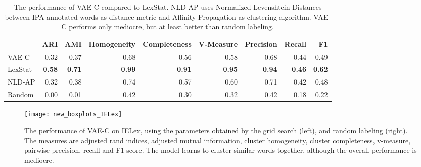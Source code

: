 \documentclass[6pt]{article}
\begin{document}
\begin{table}
\begin{tabular}{l | rrrrrrrr}
\toprule
{} &       ARI &       AMI &         Homogeneity &        Completeness &         V-Measure &Precision&Recall&F1 \\  \hline
\midrule
VAE-C &  0.32 &  0.37 &  0.68 &  0.56 &  0.58 &  0.68 &  0.44 &  0.49 \\ 
LexStat & \textbf{0.58} & \textbf{0.71} & \textbf{0.99} & \textbf{0.91} &  \textbf{0.95} & \textbf{0.94} & \textbf{0.46} &  \textbf{0.62} \\
NLD-AP &  0.32 & 0.38 & 0.74 &0.57 & 0.60 & 0.71 & 0.42 & 0.48 \\
Random &  0.00 &  0.01 &  0.42 &  0.30 &  0.32 &  0.42 &  0.18 &  0.22 \\
\bottomrule
\end{tabular}
\caption{The performance of VAE-C compared to LexStat. NLD-AP uses Normalized Levenshtein Distances between IPA-annotated words as distance metric and Affinity Propagation as clustering algorithm. VAE-C performs only mediocre, but at least better than random labeling.}
\label{table:model_comparison} 
\end{table}

 \begin{figure}[h!] 
     \texttt{[image: new\_boxplots\_IELex]} 
     \caption{The performance of VAE-C on IELex, using the parameters obtained by the grid search (left), and random labeling (right). The measures are adjusted rand indices, adjusted mutual information, cluster homogeneity, cluster completeness, v-measure, pairwise precision, recall and F1-score. The model learns to cluster similar words together, although the overall performance is mediocre.}
    \label{fig:boxplots_IELex} 
\end{figure}


%
%
\end{document}
